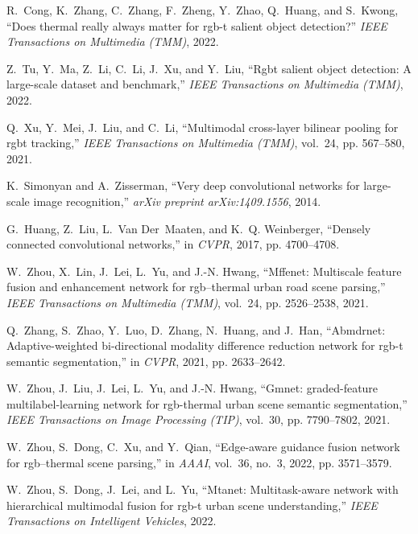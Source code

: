 \documentclass[10.5pt,twocolumn,journal,letterpaper]{IEEEtran}
\begin{document}
\begin{thebibliography}{10}
	R.~Cong, K.~Zhang, C.~Zhang, F.~Zheng, Y.~Zhao, Q.~Huang, and S.~Kwong, ``Does
	thermal really always matter for rgb-t salient object detection?'' \emph{IEEE
		Transactions on Multimedia (TMM)}, 2022.
	
	Z.~Tu, Y.~Ma, Z.~Li, C.~Li, J.~Xu, and Y.~Liu, ``Rgbt salient object detection:
	A large-scale dataset and benchmark,'' \emph{IEEE Transactions on Multimedia
		(TMM)}, 2022.
	
	Q.~Xu, Y.~Mei, J.~Liu, and C.~Li, ``Multimodal cross-layer bilinear pooling for
	rgbt tracking,'' \emph{IEEE Transactions on Multimedia (TMM)}, vol.~24, pp.
	567--580, 2021.
	
	K.~Simonyan and A.~Zisserman, ``Very deep convolutional networks for
	large-scale image recognition,'' \emph{arXiv preprint arXiv:1409.1556}, 2014.
	
	G.~Huang, Z.~Liu, L.~Van Der~Maaten, and K.~Q. Weinberger, ``Densely connected
	convolutional networks,'' in \emph{CVPR}, 2017, pp. 4700--4708.
	
	W.~Zhou, X.~Lin, J.~Lei, L.~Yu, and J.-N. Hwang, ``Mffenet: Multiscale feature
	fusion and enhancement network for rgb--thermal urban road scene parsing,''
	\emph{IEEE Transactions on Multimedia (TMM)}, vol.~24, pp. 2526--2538, 2021.
	
	Q.~Zhang, S.~Zhao, Y.~Luo, D.~Zhang, N.~Huang, and J.~Han, ``Abmdrnet:
	Adaptive-weighted bi-directional modality difference reduction network for
	rgb-t semantic segmentation,'' in \emph{CVPR}, 2021, pp. 2633--2642.
	
	W.~Zhou, J.~Liu, J.~Lei, L.~Yu, and J.-N. Hwang, ``Gmnet: graded-feature
	multilabel-learning network for rgb-thermal urban scene semantic
	segmentation,'' \emph{IEEE Transactions on Image Processing (TIP)}, vol.~30,
	pp. 7790--7802, 2021.
	
	W.~Zhou, S.~Dong, C.~Xu, and Y.~Qian, ``Edge-aware guidance fusion network for
	rgb--thermal scene parsing,'' in \emph{AAAI}, vol.~36, no.~3, 2022, pp.
	3571--3579.
	
	W.~Zhou, S.~Dong, J.~Lei, and L.~Yu, ``Mtanet: Multitask-aware network with
	hierarchical multimodal fusion for rgb-t urban scene understanding,''
	\emph{IEEE Transactions on Intelligent Vehicles}, 2022.
	

\end{thebibliography}
\end{document}
